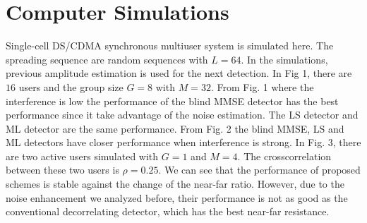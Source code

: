 \documentclass[conference]{IEEEtran}
\begin{document}
\section{Computer Simulations}

\begin{figure} \label{BER1}
\end{figure}

\begin{figure} \label{BER2}
\end{figure}


Single-cell DS/CDMA synchronous multiuser system is simulated
here. The spreading sequence are random sequences with $L=64$. In
the simulations, previous amplitude estimation is used for the
next detection. In Fig 1, there are $16$ users and the group size
$G=8$ with $M=32$. From Fig. 1 where the interference is low the
performance of the blind MMSE detector has the best performance
since it take advantage of the noise estimation. The LS detector
and ML detector are the same performance. From Fig. 2 the blind
MMSE, LS and ML detectors have closer performance when
interference is strong. In Fig. 3, there are two active users
simulated with $G=1$ and $M=4$. The crosscorrelation between these
two users is $\rho=0.25$. We can see that the performance of
proposed schemes is stable against the change of the near-far
ratio. However, due to the noise enhancement we analyzed before,
their performance is not as good as the conventional decorrelating
detector, which has the best near-far resistance.
\end{document}
